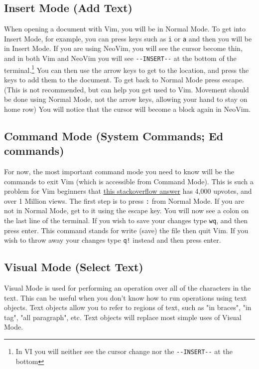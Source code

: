 \documentclass[11pt]{article}
\begin{document}
\subsection{Insert Mode (Add Text)}
\label{sec:org075ae3e}
When opening a document with Vim, you will be in Normal Mode. To get into Insert
Mode, for example, you can press keys such as \texttt{i} or \texttt{a} and then you will be in
Insert Mode. If you are using NeoVim, you will see the cursor become thin, and
in both Vim and NeoVim you will see \texttt{-{}-INSERT-{}-} at the bottom of the
terminal.\footnote{In VI you will neither see the cursor change nor the \texttt{-{}-INSERT-{}-} at the bottom} You can then use the arrow keys to get to the location, and
press the keys to add them to the document. To get back to Normal Mode press
escape. (This is not recommended, but can help you get used to Vim. Movement
should be done using Normal Mode, not the arrow keys, allowing your hand to stay
on home row) You will notice that the cursor will become a block again in
NeoVim.
\subsection{Command Mode (System Commands; Ed commands)}
\label{sec:org3926c65}
For now, the most important command mode you need to know will be the commands
to exit Vim (which is accessible from Command Mode). This is such a problem for
Vim beginners that \href{https://stackoverflow.com/questions/11828270/how-to-exit-the-vim-editor}{this stackoverflow answer} has 4,000 upvotes, and
over 1 Million views. The first step is to press \texttt{:} from Normal Mode. If you
are not in Normal Mode, get to it using the escape key. You will now see a colon
on the last line of the terminal. If you wish to save your changes type \texttt{wq},
and then press enter. This command stands for write (save) the file then quit
Vim. If you wish to throw away your changes type \texttt{q!} instead and then press enter.
\subsection{Visual Mode (Select Text)}
\label{sec:orgd47a530}
Visual Mode is used for performing an operation over all of the characters in
the text. This can be useful when you don't know how to run operations using
text objects. Text objects allow you to refer to regions of text, such as "in
braces", "in tag", "all paragraph", etc. Text objects will replace most simple
uses of Visual Mode.
\end{document}
